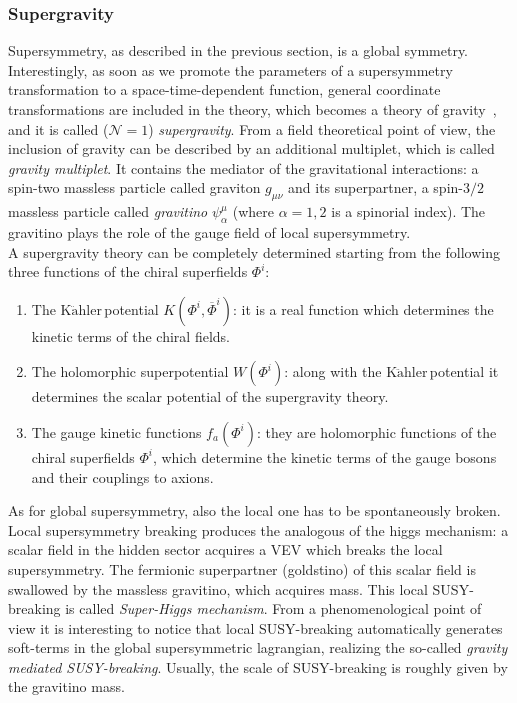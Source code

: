 \documentclass[12pt,a4paper]{book}
\newcommand{\Kahler}{\ensuremath{\text{K}\ddot{\text{a}}\text{hler}\,}}
\newcommand{\ben}{\begin{enumerate}}
\newcommand{\een}{\end{enumerate}}
\begin{document}
\subsubsection{Supergravity}
\label{sssec:SUGRA}

Supersymmetry, as described in the previous section, is a global symmetry. Interestingly, as soon as we promote the parameters of a supersymmetry transformation to a space-time-dependent function, general coordinate transformations are included in the theory, which becomes a theory of gravity~\cite{Nilles:1983ge, Cerdeno:1998hs, Wess:1992cp}, and it is called ($\mathcal{N} = 1$) \textit{supergravity}. From a field theoretical point of view, the inclusion of gravity can be described by an additional multiplet, which is called \textit{gravity multiplet}. It contains the mediator of the gravitational interactions: a spin-two massless particle called graviton $g_{\mu \nu}$ and its superpartner, a spin-$3/2$ massless particle called \textit{gravitino} $\psi^\mu_\alpha$ (where $\alpha = 1, 2$ is a spinorial index). The gravitino plays the role of the gauge field of local supersymmetry.\\

A supergravity theory can be completely determined starting from the following three functions of the chiral superfields $\Phi^i$:
\ben
\item The \Kahler potential $K(\Phi^i, \overline{\Phi}^i)$: it is a real function which determines the kinetic terms of the chiral fields.
\item The holomorphic superpotential $W(\Phi^i)$: along with the \Kahler potential it determines the scalar potential of the supergravity theory.
\item The gauge kinetic functions $f_a(\Phi^i)$: they are holomorphic functions of the chiral superfields $\Phi^i$, which determine the kinetic terms of the gauge bosons and their couplings to axions.
\een

As for global supersymmetry, also the local one has to be spontaneously broken. Local supersymmetry breaking produces the analogous of the higgs mechanism: a scalar field in the hidden sector acquires a VEV which breaks the local supersymmetry. The fermionic superpartner (goldstino) of this scalar field is swallowed by the massless gravitino, which acquires mass. This local SUSY-breaking is called \textit{Super-Higgs mechanism}. From a phenomenological point of view it is interesting to notice that local SUSY-breaking automatically generates soft-terms in the global supersymmetric lagrangian, realizing the so-called \textit{gravity mediated SUSY-breaking}. Usually, the scale of SUSY-breaking is roughly given by the gravitino mass.\\
\end{document}
